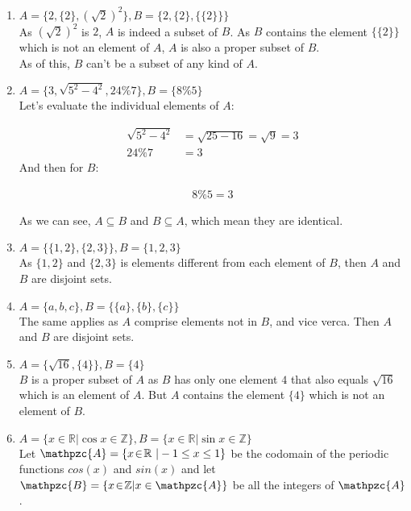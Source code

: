 \documentclass{article}
\newcommand{\mAlign}[1]{\begin{align*}#1\end{align*}}
\newcommand{\doubleR}{\mathbb{R}}
\newcommand{\doubleZ}{\mathbb{Z}}
\newcommand{\In}{\! \in \!}
\newcommand{\script}[1]{\mathpzc{#1}}
\begin{document}
	\begin{enumerate}[label = \textbf{a.}]
		\item $A = \{2,\{2\},(\sqrt{2})^2\}, B = \{2,\{2\},\{\{2\}\}\}$\\
		
		As $(\sqrt{2})^2$ is $2$, $A$ is indeed a subset of $B$. As $B$ contains the element $\{\{2\}\}$ which is not an element of $A$, $A$ is also a proper subset of $B$.\\
		
		As of this, $B$ can't be a subset of any kind of $A$.
		
		\item $A = \{3, \sqrt{5^2 - 4^2}, 24 \%  7\}, B = \{8 \% 5\}$\\
		
		Let's evaluate the individual elements of $A$:
		
		\mAlign{\sqrt{5^2 - 4^2} &= \sqrt{25 - 16} = \sqrt{9} = 3\\
						24\%7 &= 3}
		And then for $B$:
		
		\mAlign{8 \% 5 = 3}
		
		As we can see, $A\subseteq B$ and $B \subseteq A$, which mean they are identical.
		
		\item $A = \{\{1,2\},\{2,3\}\}, B = \{1,2,3\}$\\
		
		As $\{1,2\}$ and $\{2,3\}$ is elements different from each element of $B$, then $A$ and $B$ are disjoint sets.
		
		\item $A = \{a,b,c\}, B = \{\{a\},\{b\},\{c\}\}$\\
		
		The same applies as $A$ comprise elements not in $B$, and vice verca. Then $A$ and $B$ are disjoint sets.
		
		\item  $A = \{\sqrt{16},\{4\}\}, B = \{4\}$\\
		
		$B$ is a proper subset of $A$ as $B$ has only one element $4$ that also equals $\sqrt{16}$ which is an element of $A$. But $A$ contains the element $\{4\}$ which is not an element of $B$.
		
		\item $A = \{x \In \doubleR | \cos{x} \in \doubleZ\}, B = \{x \In \doubleR | \sin{x} \in \doubleZ\}$\\
		
		Let $\script{A} = \{x \In \doubleR\ | -1 \leq x \leq 1\}$ be the codomain of the periodic functions $cos(x)$ and $sin(x)$ and let $\script{B} = \{x \In \doubleZ | x \in \script{A}\}$ be all the integers of $\script{A}$.\\
		

\end{enumerate}
\end{document}
